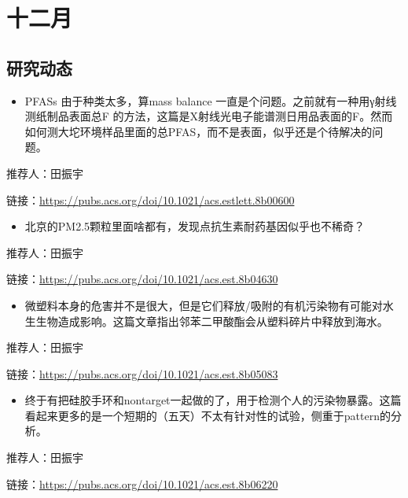 \documentclass[]{book}
\providecommand{\tightlist}{%
  \setlength{\itemsep}{0pt}\setlength{\parskip}{0pt}}
\begin{document}
\hypertarget{ux5341ux4e8cux6708-1}{%
\section*{十二月}\label{ux5341ux4e8cux6708-1}}

\hypertarget{ux7814ux7a76ux52a8ux6001-13}{%
\subsection*{研究动态}\label{ux7814ux7a76ux52a8ux6001-13}}

\begin{itemize}
\tightlist
\item
  PFASs 由于种类太多，算mass balance 一直是个问题。之前就有一种用γ射线测纸制品表面总F 的方法，这篇是X射线光电子能谱测日用品表面的F。然而如何测大坨环境样品里面的总PFAS，而不是表面，似乎还是个待解决的问题。
\end{itemize}

推荐人：田振宇

链接：\url{https://pubs.acs.org/doi/10.1021/acs.estlett.8b00600}

\begin{itemize}
\tightlist
\item
  北京的PM2.5颗粒里面啥都有，发现点抗生素耐药基因似乎也不稀奇？
\end{itemize}

推荐人：田振宇

链接：\url{https://pubs.acs.org/doi/10.1021/acs.est.8b04630}

\begin{itemize}
\tightlist
\item
  微塑料本身的危害并不是很大，但是它们释放/吸附的有机污染物有可能对水生生物造成影响。这篇文章指出邻苯二甲酸酯会从塑料碎片中释放到海水。
\end{itemize}

推荐人：田振宇

链接：\url{https://pubs.acs.org/doi/10.1021/acs.est.8b05083}

\begin{itemize}
\tightlist
\item
  终于有把硅胶手环和nontarget一起做的了，用于检测个人的污染物暴露。这篇看起来更多的是一个短期的（五天）不太有针对性的试验，侧重于pattern的分析。
\end{itemize}

推荐人：田振宇

链接：\url{https://pubs.acs.org/doi/10.1021/acs.est.8b06220}
\end{document}
